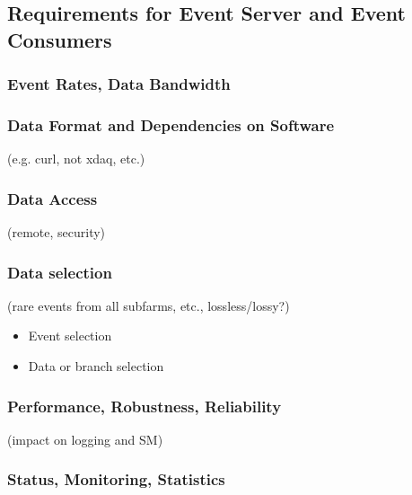 \subsection{Requirements for Event Server and Event Consumers}


\subsubsection{Event Rates, Data Bandwidth}

\subsubsection{Data Format and Dependencies on Software}

 (e.g. curl, not xdaq, etc.)

\subsubsection{Data Access}
 
  (remote, security)

\subsubsection{Data selection}
  
(rare events from all subfarms, etc., lossless/lossy?)

\begin{itemize}
\item
Event selection
\item
Data or branch selection
\end{itemize}

\subsubsection{Performance, Robustness, Reliability}

(impact on logging and SM)

\subsubsection{Status, Monitoring, Statistics}

